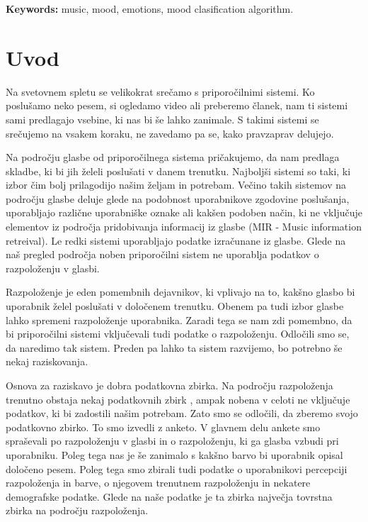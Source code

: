 \documentclass[a4paper, 12pt]{book}
\newcommand{\tkeywordsEn}{music, mood, emotions,  mood clasification algorithm}
\newcommand{\clearemptydoublepage}{\newpage{\pagestyle{empty}\cleardoublepage}}
\begin{document}
{\bigskip

\noindent\textbf{Keywords:} \tkeywordsEn.
\clearemptydoublepage

\mainmatter
\setcounter{page}{1}
\pagestyle{fancy}


\chapter{Uvod}

Na svetovnem spletu se velikokrat srečamo s priporočilnimi sistemi. Ko poslušamo neko pesem, si ogledamo video ali preberemo članek, nam ti sistemi sami predlagajo vsebine, ki nas bi še lahko zanimale. S takimi sistemi se srečujemo na vsakem koraku, ne zavedamo pa se, kako pravzaprav delujejo. 

Na področju glasbe od priporočilnega sistema pričakujemo, da nam predlaga skladbe, ki bi jih želeli poslušati v danem trenutku. Najboljši sistemi so taki, ki izbor čim bolj prilagodijo našim željam in potrebam. Večino takih sistemov na področju glasbe deluje glede na podobnost uporabnikove zgodovine poslušanja, uporabljajo različne uporabniške oznake ali kakšen podoben način, ki ne vključuje elementov iz področja pridobivanja informacij iz glasbe (MIR - Music information retreival). Le redki sistemi uporabljajo podatke izračunane iz glasbe. Glede na naš pregled področja noben priporočilni sistem ne uporablja podatkov o razpoloženju v glasbi. 

Razpoloženje je eden pomembnih dejavnikov, ki vplivajo na to, kakšno glasbo bi uporabnik želel poslušati v določenem trenutku. Obenem pa tudi izbor glasbe lahko spremeni razpoloženje uporabnika. Zaradi tega se nam zdi pomembno, da bi priporočilni sistemi vključevali tudi podatke o razpoloženju. Odločili smo se, da naredimo tak sistem. Preden pa lahko ta sistem razvijemo, bo potrebno še nekaj raziskovanja. 

Osnova za raziskavo je dobra podatkovna zbirka. Na področju razpoloženja trenutno obstaja nekaj podatkovnih zbirk \cite{eerola2010comparison, schmidt2011modeling, turnbull2008semantic, schuller2010mister, panda2013multi}, ampak nobena v celoti ne vključuje podatkov, ki bi zadostili našim potrebam. Zato smo se odločili, da zberemo svojo podatkovno zbirko. To smo izvedli z anketo. V glavnem delu ankete smo spraševali po razpoloženju v glasbi in o razpoloženju, ki ga glasba vzbudi pri uporabniku. Poleg tega nas je še zanimalo s kakšno barvo bi uporabnik opisal določeno pesem. Poleg tega smo zbirali tudi podatke o uporabnikovi percepciji razpoloženja in barve, o njegovem trenutnem razpoloženju in nekatere demografske podatke. Glede na naše podatke je ta zbirka največja tovrstna zbirka na področju razpoloženja. 

}
\end{document}
